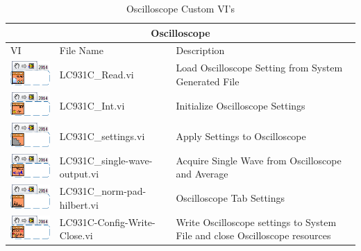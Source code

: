 \documentclass[letterpaper, twoside, openright]{report}
\begin{document}
\begin{table}
	\centering
	\begin{tabular}{ m{2.5cm} | m{5cm} | m{5cm} }
		\hline
		\hline \multicolumn{3}{c}{Oscilloscope} \\ \hline \hline
		VI & File Name & Description \\ \hline
		\includegraphics[scale=0.625]{LC931C_Read_main} & LC931C\_Read.vi & Load Oscilloscope Setting from System Generated File \\ \hline
		\includegraphics[scale=0.625]{LC931C_Int_main_02} & LC931C\_Int.vi & Initialize Oscilloscope Settings \\ \hline
		\includegraphics[scale=0.625]{LC931C_settings_main_01} & LC931C\_settings.vi & Apply Settings to Oscilloscope \\ \hline
		\includegraphics[scale=0.625]{LC931C_single-wave-output_main_01} & LC931C\_single-wave-output.vi & Acquire Single Wave from Oscilloscope and Average \\ \hline
		\includegraphics[scale=0.625]{LC931C_norm-pad-hilbert_main_01} & LC931C\_norm-pad-hilbert.vi & Oscilloscope Tab Settings \\ \hline
		\includegraphics[scale=0.625]{LC931C-Config-Write-Close_main_01} & LC931C-Config-Write-Close.vi & Write Oscilloscope settings to System File and close Oscilloscope resources \\ \hline
	\end{tabular}
	\caption{Oscilloscope Custom VI's}
	\label{tab:1}
\end{table}
\end{document}
